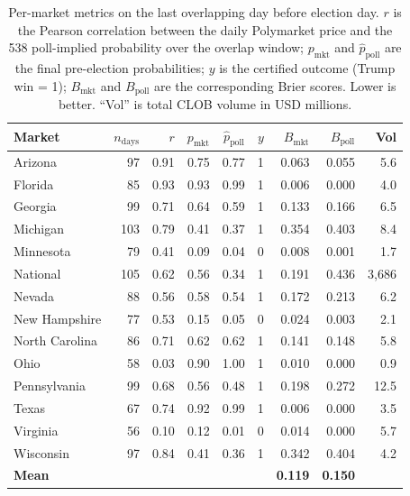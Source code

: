 \documentclass{article}
\begin{document}
\begin{table}[t]
\caption{Per-market metrics on the last overlapping day before election day.
$r$ is the Pearson correlation between the daily Polymarket price and
the 538 poll-implied probability over the overlap window;
$p_{\mathrm{mkt}}$ and $\hat p_{\mathrm{poll}}$ are the final
pre-election probabilities;
$y$ is the certified outcome (Trump win = 1);
$B_{\mathrm{mkt}}$ and $B_{\mathrm{poll}}$ are the corresponding Brier
scores. Lower is better. ``Vol'' is total CLOB volume in USD millions.}
\label{tab:perstate}
\centering
\small
\begin{tabular}{lrrrrrrrr}
\toprule
Market & $n_{\mathrm{days}}$ & $r$ & $p_{\mathrm{mkt}}$ & $\hat p_{\mathrm{poll}}$ & $y$ & $B_{\mathrm{mkt}}$ & $B_{\mathrm{poll}}$ & Vol \\
\midrule
Arizona        & 97  & 0.91 & 0.75 & 0.77 & 1 & 0.063 & 0.055 & 5.6 \\
Florida        & 85  & 0.93 & 0.93 & 0.99 & 1 & 0.006 & 0.000 & 4.0 \\
Georgia        & 99  & 0.71 & 0.64 & 0.59 & 1 & 0.133 & 0.166 & 6.5 \\
Michigan       & 103 & 0.79 & 0.41 & 0.37 & 1 & 0.354 & 0.403 & 8.4 \\
Minnesota      & 79  & 0.41 & 0.09 & 0.04 & 0 & 0.008 & 0.001 & 1.7 \\
National       & 105 & 0.62 & 0.56 & 0.34 & 1 & 0.191 & 0.436 & 3{,}686 \\
Nevada         & 88  & 0.56 & 0.58 & 0.54 & 1 & 0.172 & 0.213 & 6.2 \\
New Hampshire  & 77  & 0.53 & 0.15 & 0.05 & 0 & 0.024 & 0.003 & 2.1 \\
North Carolina & 86  & 0.71 & 0.62 & 0.62 & 1 & 0.141 & 0.148 & 5.8 \\
Ohio           & 58  & 0.03 & 0.90 & 1.00 & 1 & 0.010 & 0.000 & 0.9 \\
Pennsylvania   & 99  & 0.68 & 0.56 & 0.48 & 1 & 0.198 & 0.272 & 12.5 \\
Texas          & 67  & 0.74 & 0.92 & 0.99 & 1 & 0.006 & 0.000 & 3.5 \\
Virginia       & 56  & 0.10 & 0.12 & 0.01 & 0 & 0.014 & 0.000 & 5.7 \\
Wisconsin      & 97  & 0.84 & 0.41 & 0.36 & 1 & 0.342 & 0.404 & 4.2 \\
\midrule
\textbf{Mean}  &     &      &      &      &   & \textbf{0.119} & \textbf{0.150} & \\
\bottomrule
\end{tabular}
\end{table}
\end{document}
